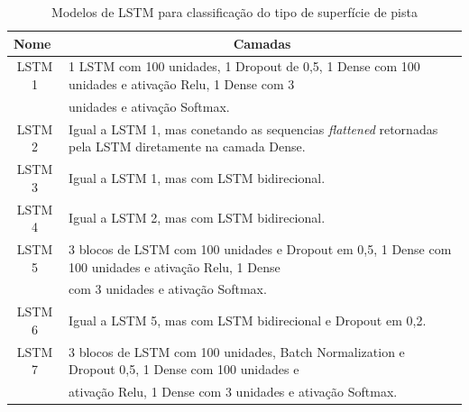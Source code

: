 \begin{table}[h!]
\scriptsize
\centering
\caption{Modelos de LSTM para classificação do tipo de superfície de pista}
\label{table:lstm_superficie_pista_1}
\begin{tabular}{cl}
\toprule 
\multicolumn{1}{l}{\textbf{Nome}} & 
\multicolumn{1}{c}{\textbf{Camadas}} \\ \midrule
LSTM 1 & 1 LSTM com 100 unidades, 1 Dropout de 0,5, 1 Dense com 100 unidades e ativação Relu,  1 Dense com 3 \\ & unidades e  ativação Softmax. \\ \midrule
LSTM 2 & Igual a LSTM 1, mas conetando as sequencias \textit{flattened} retornadas pela LSTM diretamente na camada Dense. \\ \midrule
LSTM 3 & Igual a LSTM 1, mas com LSTM bidirecional. \\ \midrule
LSTM 4 & Igual a LSTM 2, mas com LSTM bidirecional. \\ \midrule
LSTM 5 & 3 blocos de LSTM com 100 unidades e Dropout em 0,5, 1 Dense com 100 unidades e ativação Relu, 1 Dense \\ & com 3  unidades e ativação Softmax.\\ \midrule
LSTM 6 & Igual a LSTM 5, mas com LSTM bidirecional e Dropout em 0,2. \\ \midrule
LSTM 7 & 3 blocos de LSTM com 100 unidades, Batch Normalization e Dropout 0,5, 1 Dense com 100 unidades e \\ & ativação Relu, 1 Dense com 3 unidades e ativação Softmax. \\ \bottomrule
\end{tabular}
\end{table}

